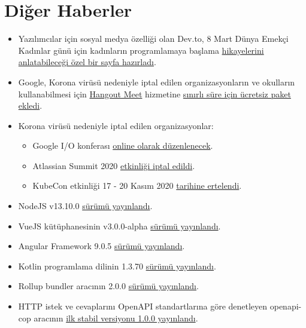 \documentclass[11pt]{article}
\begin{document}
\section{Diğer Haberler}
\label{sec:org073052c}
\begin{itemize}
\item Yazılımcılar için sosyal medya özelliği olan Dev.to, 8 Mart Dünya Emekçi
Kadınlar günü için kadınların programlamaya başlama \href{https://dev.to/t/shecoded}{hikayelerini
anlatabileceği özel bir sayfa hazırladı}.
\item Google, Korona virüsü nedeniyle iptal edilen organizasyonların ve okulların
kullanabilmesi için \href{https://gsuite.google.com/products/meet/}{Hangout Meet} hizmetine \href{https://cloud.google.com/blog/products/g-suite/helping-businesses-and-schools-stay-connected-in-response-to-coronavirus}{sınırlı süre için ücretsiz paket
ekledi}.
\item Korona virüsü nedeniyle iptal edilen organizasyonlar:
\begin{itemize}
\item Google I/O konferası \href{https://techcrunch.com/2020/03/03/google-cancels-its-2020-i-o-developer-conference/}{online olarak düzenlenecek}.
\item Atlassian Summit 2020 \href{https://www.atlassian.com/company/events/summit}{etkinliği iptal edildi}.
\item KubeCon etkinliği 17 - 20 Kasım 2020 \href{https://events.linuxfoundation.org/kubecon-cloudnativecon-europe/attend/novel-coronavirus-update/}{tarihine ertelendi}.
\end{itemize}
\item NodeJS v13.10.0 \href{https://nodejs.org/en/blog/release/v13.10.0/}{sürümü yayınlandı}.
\item VueJS kütüphanesinin v3.0.0-alpha \href{https://github.com/vuejs/vue-next/releases/tag/v3.0.0-alpha.8}{sürümü yayınlandı}.
\item Angular Framework 9.0.5 \href{https://github.com/angular/angular/releases/tag/9.0.5}{sürümü yayınlandı}.
\item Kotlin programlama dilinin 1.3.70 \href{https://blog.jetbrains.com/kotlin/2020/03/kotlin-1-3-70-released/}{sürümü yayınlandı}.
\item Rollup bundler aracının 2.0.0 \href{https://github.com/rollup/rollup/releases/tag/v2.0.0}{sürümü yayınlandı}.
\item HTTP istek ve cevaplarını OpenAPI standartlarına göre denetleyen openapi-cop
aracının \href{https://github.com/EXXETA/openapi-cop}{ilk stabil versiyonu 1.0.0 yayınlandı}.
\end{itemize}
\end{document}
